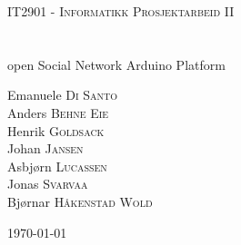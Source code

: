 \begin{titlepage}
	\begin{center}
		\textsc{\Large IT2901 - Informatikk Prosjektarbeid II}\\[0.5cm]
		\HRule \\[0.6cm]
		{ \huge \bfseries \project}\\[0.4cm]
		open Social Network Arduino Platform
		\HRule \\[1.5cm]
		\begin{center} \large
			Emanuele \textsc{Di Santo} \\
			Anders \textsc{Behne Eie} \\
			Henrik \textsc{Goldsack} \\
			Johan \textsc{Jansen} \\
			Asbjørn \textsc{Lucassen} \\
			Jonas \textsc{Svarvaa} \\
			Bjørnar \textsc{Håkenstad Wold}
		\end{center}
		\vfill
		{\large \today}
	\end{center}
\end{titlepage}

